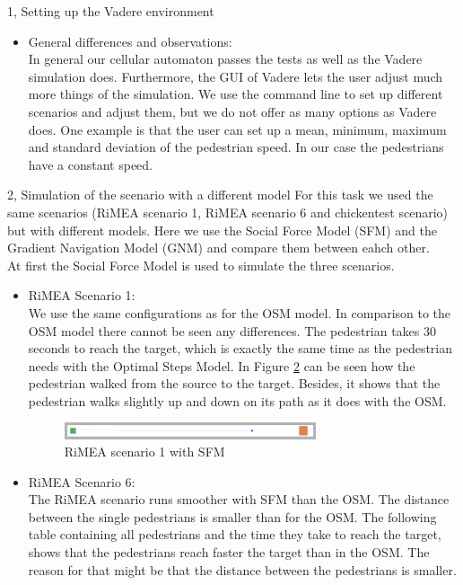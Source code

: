 \documentclass[10pt,a4paper]{article}
\begin{document}
\begin{task}{1, Setting up the Vadere environment}
\begin{itemize}
\begin{figure}[H]
        \caption{Chickentest with OSM}
        \label{fig:chickentest_osm}
    \end{figure}
    \item General differences and observations: \\
    In general our cellular automaton passes the tests as well as the Vadere simulation does. Furthermore, the GUI of Vadere lets the user adjust much more things of the simulation. We use the command line to set up different scenarios and adjust them, but we do not offer as many options as Vadere does. One example is that the user can set up a mean, minimum, maximum and standard deviation of the pedestrian speed. In our case the pedestrians have a constant speed.
\end{itemize}
\end{task}
\begin{task}{2, Simulation of the scenario with a different model}
For this task we used the same scenarios (RiMEA scenario 1, RiMEA scenario 6 and chickentest scenario) but with different models. Here we use the Social Force Model (SFM) and the Gradient Navigation Model (GNM) and compare them between eahch other.\\
At first the Social Force Model is used to simulate the three scenarios.
\begin{itemize}
    \item RiMEA Scenario 1:\\
    We use the same configurations as for the OSM model. In comparison to the OSM model there cannot be seen any differences. The pedestrian takes 30 seconds to reach the target, which is exactly the same time as the pedestrian needs with the Optimal Steps Model. In Figure \ref{fig:rimea1_sfm} can be seen how the pedestrian walked from the source to the target. Besides, it shows that the pedestrian walks slightly up and down on its path as it does with the OSM.
    \begin{figure}[H]
        \centering
        \includegraphics[width=0.7\textwidth]{pictures/sfm/rimeatest1.png}
        \caption{RiMEA scenario 1 with SFM}
        \label{fig:rimea1_sfm}
    \end{figure}
    \item RiMEA Scenario 6:\\
    The RiMEA scenario runs smoother with SFM than the OSM. The distance between the single pedestrians is smaller than for the OSM. The following table containing all pedestrians and the time they take to reach the target, shows that the pedestrians reach faster the target than in the OSM. The reason for that might be that the distance between the pedestrians is smaller.

\end{itemize}
\end{task}
\end{document}
